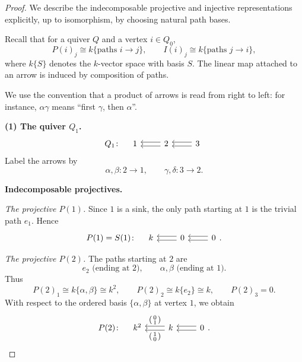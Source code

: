 \documentclass[11pt, a4paper]{article}
\begin{document}
\begin{enumerate}[leftmargin=*, label=\textbf{\arabic*.}]
\begin{proof}
    We describe the indecomposable projective and injective representations explicitly, up to isomorphism, by choosing natural path bases.
    
    Recall that for a quiver $Q$ and a vertex $i\in Q_0$,
    \[
    P(i)_j \cong k\{\text{paths } i\to j\},
    \qquad
    I(i)_j \cong k\{\text{paths } j\to i\},
    \]
    where $k\{S\}$ denotes the $k$-vector space with basis $S$.
    The linear map attached to an arrow is induced by composition of paths.
    
    \medskip
    
    \noindent
    We use the convention that a product of arrows is read from right to left:
    for instance, $\alpha\gamma$ means ``first $\gamma$, then $\alpha$''.
    
    \bigskip
    \noindent\textbf{(1) The quiver $Q_1$.}
    \[
    Q_1 \colon \quad
    \begin{tikzcd}
    1 & 2 \arrow[l, shift left] \arrow[l, shift right] & 3 \arrow[l, shift left] \arrow[l, shift right]
    \end{tikzcd}
    \]
    Label the arrows by
    \[
    \alpha,\beta \colon 2 \to 1,
    \qquad
    \gamma,\delta \colon 3 \to 2.
    \]
    
    \medskip
    \noindent\textbf{Indecomposable projectives.}
    
    \smallskip
    \noindent\emph{The projective $P(1)$.}
    Since $1$ is a sink, the only path starting at $1$ is the trivial path $e_1$.
    Hence
    \[
    P(1)=S(1)\colon\quad
    \begin{tikzcd}
    k & 0 \arrow[l, shift left] \arrow[l, shift right] & 0 \arrow[l, shift left] \arrow[l, shift right]
    \end{tikzcd}.
    \]
    
    \smallskip
    \noindent\emph{The projective $P(2)$.}
    The paths starting at $2$ are
    \[
    e_2 \text{ (ending at $2$)}, \qquad \alpha,\beta \text{ (ending at $1$)}.
    \]
    Thus
    \[
    P(2)_1 \cong k\{\alpha,\beta\}\cong k^2,\qquad
    P(2)_2 \cong k\{e_2\}\cong k,\qquad
    P(2)_3=0.
    \]
    With respect to the ordered basis $\{\alpha,\beta\}$ at vertex $1$, we obtain
    \[
    P(2)\colon\quad
    \begin{tikzcd}
    k^2 & k \arrow[l, "{\begin{psmallmatrix}1\\0\end{psmallmatrix}}", shift left]
          \arrow[l, "{\begin{psmallmatrix}0\\1\end{psmallmatrix}}"', shift right]
        & 0 \arrow[l, shift left] \arrow[l, shift right]
    \end{tikzcd}.
    \]
    

\end{proof}
\end{enumerate}
\end{document}
